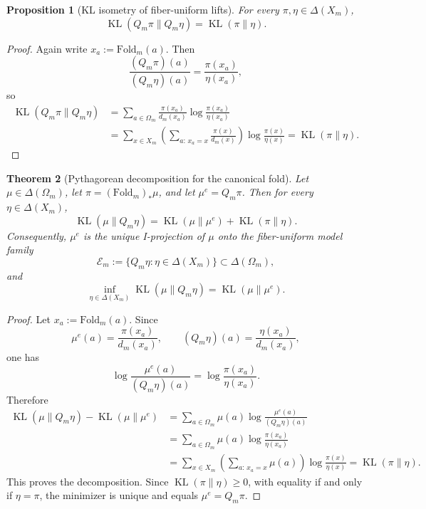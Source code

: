 \documentclass[11pt,letterpaper]{article}
\numberwithin{equation}{section}
\theoremstyle{plain}
\newtheorem{theorem}{Theorem}[section]
\newtheorem{proposition}[theorem]{Proposition}
\theoremstyle{definition}
\theoremstyle{remark}
\newcommand{\Fold}{\mathrm{Fold}}
\DeclareMathOperator{\KL}{KL}
\begin{document}
\begin{proposition}[KL isometry of fiber-uniform lifts]\label{prop:fold-fiber-lift-kl-isometry}
For every \(\pi,\eta\in\Delta(X_m)\),
\[
\KL(Q_m\pi\|Q_m\eta)=\KL(\pi\|\eta).
\]
\end{proposition}

\begin{proof}
Again write \(x_a:=\Fold_m(a)\). Then
\[
\frac{(Q_m\pi)(a)}{(Q_m\eta)(a)}
=
\frac{\pi(x_a)}{\eta(x_a)},
\]
so
\[
\begin{aligned}
\KL(Q_m\pi\|Q_m\eta)
&=
\sum_{a\in\Omega_m}\frac{\pi(x_a)}{d_m(x_a)}
\log\frac{\pi(x_a)}{\eta(x_a)}\\
&=
\sum_{x\in X_m}
\left(\sum_{a:\,x_a=x}\frac{\pi(x)}{d_m(x)}\right)
\log\frac{\pi(x)}{\eta(x)}
=
\KL(\pi\|\eta).
\end{aligned}
\]
\end{proof}

\begin{theorem}[Pythagorean decomposition for the canonical fold]\label{thm:fold-kl-pythagoras}
Let \(\mu\in\Delta(\Omega_m)\), let \(\pi=(\Fold_m)_*\mu\), and let
\(\mu^e=Q_m\pi\). Then for every \(\eta\in\Delta(X_m)\),
\[
\KL(\mu\|Q_m\eta)
=
\KL(\mu\|\mu^e)+\KL(\pi\|\eta).
\]
Consequently, \(\mu^e\) is the unique I-projection of \(\mu\) onto the
fiber-uniform model family
\[
\mathcal E_m:=\{Q_m\eta:\eta\in\Delta(X_m)\}\subset\Delta(\Omega_m),
\]
and
\[
\inf_{\eta\in\Delta(X_m)}\KL(\mu\|Q_m\eta)=\KL(\mu\|\mu^e).
\]
\end{theorem}

\begin{proof}
Let \(x_a:=\Fold_m(a)\). Since
\[
\mu^e(a)=\frac{\pi(x_a)}{d_m(x_a)},
\qquad
(Q_m\eta)(a)=\frac{\eta(x_a)}{d_m(x_a)},
\]
one has
\[
\log\frac{\mu^e(a)}{(Q_m\eta)(a)}=\log\frac{\pi(x_a)}{\eta(x_a)}.
\]
Therefore
\[
\begin{aligned}
\KL(\mu\|Q_m\eta)-\KL(\mu\|\mu^e)
&=
\sum_{a\in\Omega_m}\mu(a)\log\frac{\mu^e(a)}{(Q_m\eta)(a)}\\
&=
\sum_{a\in\Omega_m}\mu(a)\log\frac{\pi(x_a)}{\eta(x_a)}\\
&=
\sum_{x\in X_m}
\left(\sum_{a:\,x_a=x}\mu(a)\right)\log\frac{\pi(x)}{\eta(x)}
=
\KL(\pi\|\eta).
\end{aligned}
\]
This proves the decomposition. Since \(\KL(\pi\|\eta)\ge 0\), with equality if
and only if \(\eta=\pi\), the minimizer is unique and equals \(\mu^e=Q_m\pi\).
\end{proof}
\end{document}
